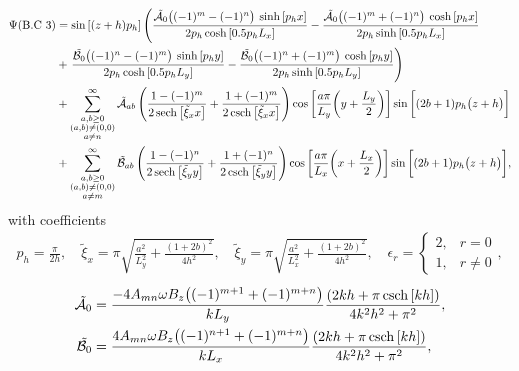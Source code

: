 \documentclass[aps,prfluids,reprint,superscriptaddress]{revtex4-2}
\newcommand{\ii}[1]{\text{#1}}
\newcommand{\nn}{\nonumber}
\begin{document}
\begin{align}
	\nn
	\Psi (\ii{B.C 3})&= 
	\sin{[(z+h)p_h]} \left(
	\dfrac{ \tilde{\mathcal A_0} \bigl((-1)^{m} - (-1)^n \bigr)\:
		\sinh{[p_h x]}}{2p_h \cosh{[0.5p_hL_x]}} 
	- 
	\dfrac{
	\tilde{\mathcal A_0} \bigl((-1)^{m} + (-1)^n \bigr) \:
		\cosh{[p_h x]}}{2p_h \sinh{[0.5p_hL_x]}}
	\right.
	\\
	\nn
	&+
	\left.
	\dfrac{ \tilde{\mathcal B_0} \bigl((-1)^{n} - (-1)^m \bigr)\:
		\sinh{[p_h y]}}{2p_h \cosh{[0.5p_hL_y]}} 
	- 
	\dfrac{
		\tilde{\mathcal B_0} \bigl((-1)^{n} + (-1)^m \bigr) \:
		\cosh{[p_h y]}}{2p_h \sinh{[0.5p_hL_y]}}
	\right)
	\\
	\nn
	&+
	\sum_{\substack{a, b \geq 0 \\ 
			(a,b)\neq (0,0) \\
			a\neq n}
		}^{\infty}
	\tilde{\mathcal{A}}_{ab}
	\left(
	\frac{1-(-1)^m}{2\sech{\bigl[\tilde\xi_x x \bigr]}} + \frac{1+(-1)^m}{2\csch{\bigl[\tilde\xi_x x \bigr]}}
	\right)
	\cos{\biggl[ \frac{a\pi}{L_y}\biggl(y + \frac{L_y}{2}\biggr)\biggr]}
	\sin{\biggl[ (2b+1)p_h\bigl(z + h\bigr)\biggr]} 
	\\
	&+
	\sum_{\substack{a, b \geq 0 \\ (a,b) 
			\neq (0,0)\\
			a\neq m		
	}}^{\infty}
	\tilde{\mathcal B}_{ab}
	\left(
	\frac{1-(-1)^n}{2\sech{\bigl[\tilde\xi_y y\bigr]}} + \frac{1+(-1)^n}{2\csch{\bigl[\tilde\xi_y y\bigr]}}
	\right)
	\cos{\biggl[ \frac{a\pi}{L_x}\biggl(x + \frac{L_x}{2}\biggr)\biggr]}
	\sin{\biggl[ (2b+1)p_h\bigl(z + h\bigr)\biggr]}
	,
	\label{eq:bc3_potential}
\end{align}
with coefficients
\begin{align}
	p_h = \frac{\pi}{2h},\quad
	\tilde\xi_x = \pi\sqrt{\frac{a^2}{L_y^2} + \frac{(1+2b)^2}{4h^2} }, \quad
	\tilde\xi_y = \pi\sqrt{\frac{a^2}{L_x^2} + \frac{(1+2b)^2}{4h^2} }, 
	\quad \epsilon_r = \left\{
	\begin{array}{cc}
		2, & r=0 \\
		1, & r\neq 0
	\end{array}
	\right . ,
	\label{eq:bc3_xi}
\end{align}
\begin{align}
	\tilde{\mathcal A_0} &= 
	\frac{
		-4A_{mn}\omega B_z \bigl( (-1)^{m+1} + (-1)^{m+n} \bigr) }
	{k L_y}
	\dfrac{(2kh + \pi\csch{[kh]})}{4k^2h^2 + \pi^2}
	, 
	\label{eq:bc3_constantsA0}
	\\
	\tilde{\mathcal B_0} &= 
	\frac{
		4A_{mn} \omega B_z \bigl( (-1)^{n+1} + (-1)^{m+n} \bigr) }
	{k L_x}
	\dfrac{(2kh + \pi\csch{[kh]})}{4k^2h^2 + \pi^2}
	,
	\label{eq:bc3_constantsB0}
\end{align}
\end{document}
